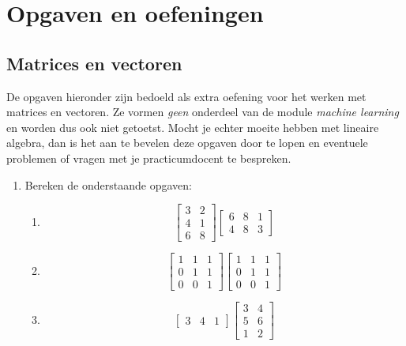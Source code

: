 \section{Opgaven en oefeningen}

\subsection{Matrices en vectoren}
De opgaven hieronder zijn bedoeld als extra oefening voor het werken met matrices en vectoren. Ze vormen \textit{geen} onderdeel van de module \textit{machine learning} en worden dus ook niet getoetst. Mocht je echter moeite hebben met lineaire algebra, dan is het aan te bevelen deze opgaven door te lopen en eventuele problemen of vragen met je practicumdocent te bespreken.

\begin{enumerate}

\item
Bereken de onderstaande opgaven:
  \begin{multicols}{2}
  \begin{enumerate}
  \item
  \[
  \begin{bmatrix}3&2 \\ 4&1 \\ 6&8\end{bmatrix}
  \begin{bmatrix}6&8&1 \\ 4&8&3\end{bmatrix}
  \]
  
  \item
  \[
  \begin{bmatrix}1&1&1\\0&1&1\\0&0&1\end{bmatrix}
  \begin{bmatrix}1&1&1\\0&1&1\\0&0&1\end{bmatrix}
  \]
  
  \item
  \[
  \begin{bmatrix}3&4&1\end{bmatrix}
  \begin{bmatrix}3&4\\5&6\\1&2\end{bmatrix}
  \]
  
  \columnbreak
  

\end{enumerate}
\end{multicols}
\end{enumerate}
